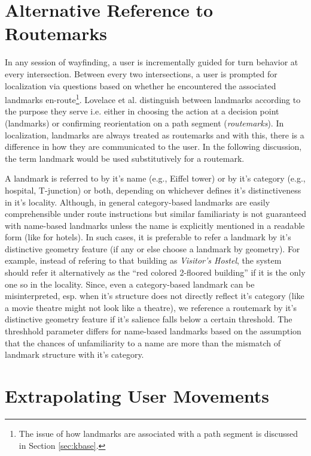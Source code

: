 \documentclass{iitkthesis}
\begin{document}
\section{Alternative Reference to Routemarks}
\label{sec:altref}
In any session of wayfinding, a user is incrementally guided for turn 
behavior at every intersection. Between every two intersections, a user is 
prompted for localization via questions based on whether he encountered 
the associated landmarks en-route\footnote{The issue of how landmarks 
are associated with a path segment is discussed in Section \ref{sec:kbase}.}. 
Lovelace et al. \cite{lovelace} distinguish between landmarks 
according to the purpose they serve i.e. either in choosing the action at 
a decision point (landmarks) or confirming reorientation on a path 
segment (\textit{routemarks}). In localization, landmarks are always 
treated as routemarks and with this, there is a difference in how they 
are communicated to the user. In the following discussion, the term 
landmark would be used substitutively for a routemark. 

A landmark is referred to by it's name (e.g., Eiffel tower) or by it's 
category (e.g., hospital, T-junction) or both, depending on whichever 
defines it's distinctiveness in it's locality. Although, in general 
category-based landmarks are easily comprehensible under route 
instructions but similar familiariaty is not guaranteed with name-based 
landmarks unless the name is explicitly mentioned in a readable form 
(like for hotels). In such cases, it is preferable to refer a landmark by 
it's distinctive geometry feature (if any or else choose a landmark by 
geometry). For example, instead of refering to that building as 
\textit{Visitor's Hostel}, the system should refer it alternatively as 
the ``red colored 2-floored building'' if it is the only one so in the 
locality. Since, even a category-based landmark can be misinterpreted, esp. 
when it's structure does not directly reflect it's category (like a movie 
theatre might not look like a theatre), we reference a routemark by it's 
distinctive geometry feature if it's salience falls below a certain 
threshold. The threshhold parameter differs for name-based landmarks 
based on the assumption that the chances of unfamiliarity to a name are 
more than the mismatch of landmark structure with it's category.
\section{Extrapolating User Movements}
\end{document}
